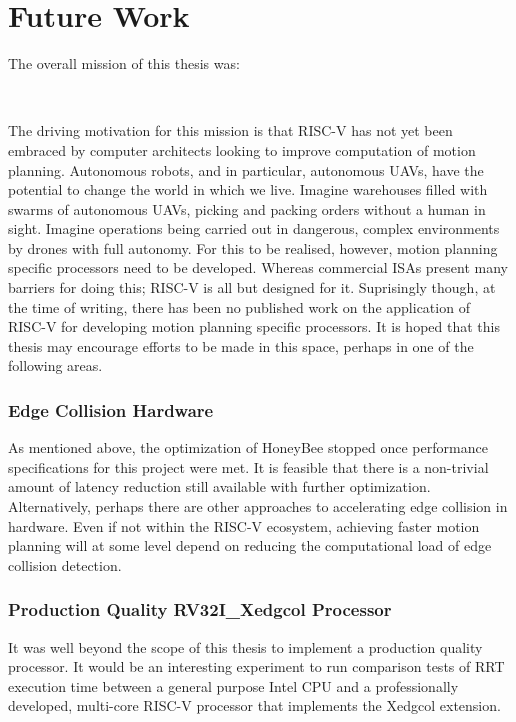 \section{Future Work}
    The overall mission of this thesis was:

    \begin{center}
    \bigskip\noindent{} \\
    \end{center}
    The driving motivation for this mission is that RISC-V has not yet been embraced by computer architects looking to improve computation of motion planning. Autonomous robots, and in particular, autonomous \glspl{UAV}, have the potential to change the world in which we live. Imagine warehouses filled with swarms of autonomous \glspl{UAV}, picking and packing orders without a human in sight. Imagine operations being carried out in dangerous, complex environments by drones with full autonomy. For this to be realised, however, motion planning specific processors need to be developed. Whereas commercial \glspl{ISA} present many barriers for doing this; RISC-V is all but designed for it. Suprisingly though, at the time of writing, there has been no published work on the application of RISC-V for developing motion planning specific processors. It is hoped that this thesis may encourage efforts to be made in this space, perhaps in one of the following areas.

    \subsubsection{Edge Collision Hardware}
    As mentioned above, the optimization of HoneyBee stopped once performance specifications for this project were met. It is feasible that there is a non-trivial amount of latency reduction still available with further optimization. Alternatively, perhaps there are other approaches to accelerating edge collision in hardware. Even if not within the RISC-V ecosystem, achieving faster motion planning will at some level depend on reducing the computational load of edge collision detection.

    \subsubsection{Production Quality RV32I\_Xedgcol Processor}
    It was well beyond the scope of this thesis to implement a production quality processor. It would be an interesting experiment to run comparison tests of RRT execution time between a general purpose Intel CPU and a professionally developed, multi-core RISC-V processor that implements the Xedgcol extension.

